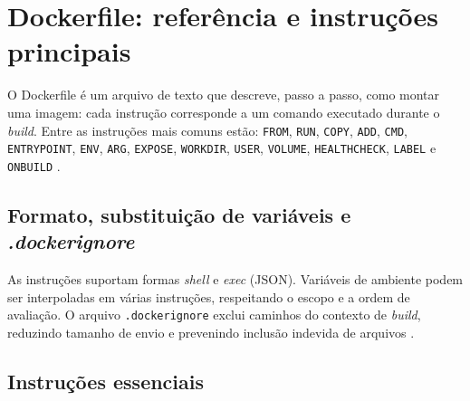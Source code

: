 \section{Dockerfile: referência e instruções principais}
\label{sec:dockerfile}

O Dockerfile é um arquivo de texto que descreve, passo a passo, como montar uma imagem: cada instrução corresponde a um comando executado durante o \textit{build}. Entre as instruções mais comuns estão: \texttt{FROM}, \texttt{RUN}, \texttt{COPY}, \texttt{ADD}, \texttt{CMD}, \texttt{ENTRYPOINT}, \texttt{ENV}, \texttt{ARG}, \texttt{EXPOSE}, \texttt{WORKDIR}, \texttt{USER}, \texttt{VOLUME}, \texttt{HEALTHCHECK}, \texttt{LABEL} e \texttt{ONBUILD} \cite{dockerfile_ref}. 

\subsection{Formato, substituição de variáveis e \textit{.dockerignore}}
\label{subsec:dockerfile-format}

As instruções suportam formas \textit{shell} e \textit{exec} (JSON). Variáveis de ambiente podem ser interpoladas em várias instruções, respeitando o escopo e a ordem de avaliação. O arquivo \texttt{.dockerignore} exclui caminhos do contexto de \textit{build}, reduzindo tamanho de envio e prevenindo inclusão indevida de arquivos \cite{dockerfile_ref}. 

\subsection{Instruções essenciais}
\label{subsec:dockerfile-core}

